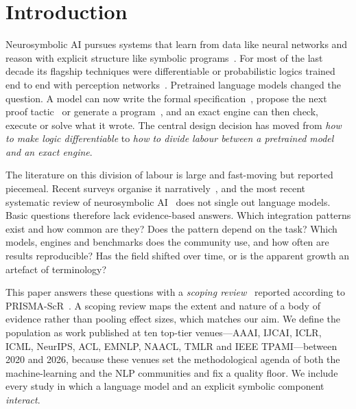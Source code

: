 \section{Introduction}
\label{sec:intro}

Neurosymbolic AI pursues systems that learn from data like neural networks and reason with explicit structure like symbolic programs~\cite{garcez2023neurosymbolic,kautz2022third,deraedt2020statistical}. For most of the last decade its flagship techniques were differentiable or probabilistic logics trained end to end with perception networks~\cite{manhaeve2018deepproblog,yang2020neurasp,huang2021scallop}. Pretrained language models changed the question. A model can now write the formal specification~\cite{wu2022autoformalization,olausson2023linc}, propose the next proof tactic~\cite{polu2020generative,yang2023leandojo} or generate a program~\cite{gao2023pal,cheng2023binding}, and an exact engine can then check, execute or solve what it wrote. The central design decision has moved from \emph{how to make logic differentiable} to \emph{how to divide labour between a pretrained model and an exact engine}.

The literature on this division of labour is large and fast-moving but reported piecemeal. Recent surveys organise it narratively~\cite{yang2025neuro,cheng2025empowering,rani2025advancing}, and the most recent systematic review of neurosymbolic AI~\cite{colelough2025neurosymbolic} does not single out language models. Basic questions therefore lack evidence-based answers. Which integration patterns exist and how common are they? Does the pattern depend on the task? Which models, engines and benchmarks does the community use, and how often are results reproducible? Has the field shifted over time, or is the apparent growth an artefact of terminology?

This paper answers these questions with a \emph{scoping review}~\cite{arksey2005scoping} reported according to PRISMA-ScR~\cite{tricco2018prisma}. A scoping review maps the extent and nature of a body of evidence rather than pooling effect sizes, which matches our aim. We define the population as work published at ten top-tier venues---AAAI, IJCAI, ICLR, ICML, NeurIPS, ACL, EMNLP, NAACL, TMLR and IEEE TPAMI---between 2020 and 2026, because these venues set the methodological agenda of both the machine-learning and the NLP communities and fix a quality floor. We include every study in which a language model and an explicit symbolic component \emph{interact}.

